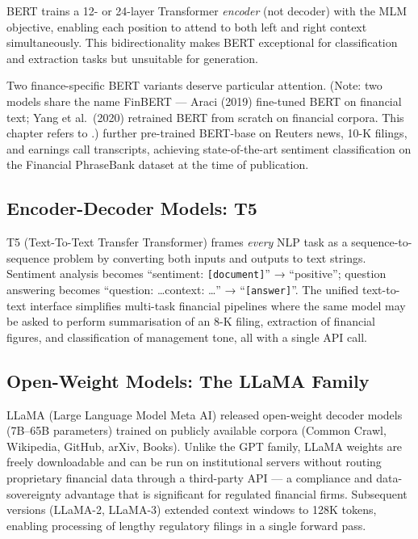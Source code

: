 \begin{deepdive}
BERT \cite{devlin2019}
trains a 12- or 24-layer Transformer \emph{encoder} (not decoder) with
the MLM objective, enabling each position to attend to both left and right
context simultaneously.  This bidirectionality makes BERT exceptional for
classification and extraction tasks but unsuitable for generation.

Two finance-specific BERT variants deserve particular attention.
(Note: two models share the name FinBERT — Araci (2019) fine-tuned BERT
on financial text; Yang et al.\ (2020) retrained BERT from scratch on
financial corpora.  This chapter refers to \cite{yang2020finbert}.)
\citet{yang2020finbert} further pre-trained BERT-base on Reuters news,
10-K filings, and earnings call transcripts, achieving state-of-the-art
sentiment classification on the Financial PhraseBank dataset at the time of
publication.

\subsection{Encoder-Decoder Models: T5}
\label{sec:llm-t5}

T5 (Text-To-Text Transfer Transformer) \cite{raffel2020t5}
frames \emph{every} NLP task as a sequence-to-sequence problem by
converting both inputs and outputs to text strings.  Sentiment analysis
becomes ``sentiment: \texttt{[document]}'' → ``positive''; question
answering becomes ``question: \ldots context: \ldots'' → ``\texttt{[answer]}''.
The unified text-to-text interface simplifies multi-task financial pipelines
where the same model may be asked to perform summarisation of an 8-K filing,
extraction of financial figures, and classification of management tone, all
with a single API call.

\subsection{Open-Weight Models: The LLaMA Family}
\label{sec:llm-llama}

LLaMA (Large Language Model Meta AI) \cite{touvron2023llama}
released open-weight decoder models (7B–65B parameters) trained on
publicly available corpora (Common Crawl, Wikipedia, GitHub, arXiv, Books).
Unlike the GPT family, LLaMA weights are freely downloadable and can be
run on institutional servers without routing proprietary financial data
through a third-party API — a compliance and data-sovereignty advantage
that is significant for regulated financial firms.  Subsequent versions
(LLaMA-2, LLaMA-3) extended context windows to 128K tokens, enabling
processing of lengthy regulatory filings in a single forward pass.


\end{deepdive}
